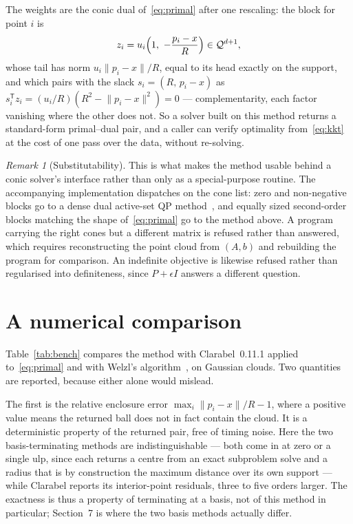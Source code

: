 \documentclass[10pt,a4paper]{article}
\theoremstyle{plain}
\theoremstyle{remark}
\newtheorem*{remark}{Remark}
\newcommand{\norm}[1]{\lVert #1 \rVert}
\newcommand{\T}{^{\mathsf{T}}}
\begin{document}
The weights are the conic dual of~\eqref{eq:primal} after one rescaling: the
block for point $i$ is
\begin{equation}
  \label{eq:conic-dual}
  z_i=u_i\Bigl(1,\ -\frac{p_i-x}{R}\Bigr)\in\mathcal{Q}^{d+1},
\end{equation}
whose tail has norm $u_i\norm{p_i-x}/R$, equal to its head exactly on the
support, and which pairs with the slack $s_i=(R,\,p_i-x)$ as
$s_i\T z_i=(u_i/R)(R^2-\norm{p_i-x}^2)=0$ --- complementarity, each factor
vanishing where the other does not. So a solver built on this method returns a
standard-form primal--dual pair, and a caller can verify optimality
from~\eqref{eq:kkt} at the cost of one pass over the data, without re-solving.

\begin{remark}[Substitutability]
  This is what makes the method usable behind a conic solver's interface rather
  than only as a special-purpose routine. The accompanying implementation
  dispatches on the cone list: zero and non-negative blocks go to a dense dual
  active-set QP method~\cite{goldfarb1983}, and equally sized second-order blocks
  matching the shape of~\eqref{eq:primal} go to the method above. A program
  carrying the right cones but a different matrix is refused rather than
  answered, which requires reconstructing the point cloud from $(A,b)$ and
  rebuilding the program for comparison. An indefinite objective is likewise
  refused rather than regularised into definiteness, since $P+\epsilon I$ answers
  a different question.
\end{remark}

\section{A numerical comparison}

Table~\ref{tab:bench} compares the method with Clarabel~0.11.1
applied to~\eqref{eq:primal} and with Welzl's algorithm~\cite{welzl1991}, on
Gaussian clouds. Two quantities are reported, because either alone would
mislead.

The first is the relative enclosure error $\max_i\norm{p_i-x}/R-1$, where a
positive value means the returned ball does not in fact contain the cloud. It is
a deterministic property of the returned pair, free of timing noise. Here the two
basis-terminating methods are indistinguishable --- both come in at zero or a
single ulp, since each returns a centre from an exact subproblem solve and a
radius that is by construction the maximum distance over its own support --- while
Clarabel reports its interior-point residuals, three to five orders larger. The
exactness is thus a property of terminating at a basis, not of this method in
particular; Section~7 is where the two basis methods actually differ.
\end{document}
